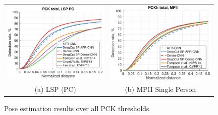 \begin{figure}
  \centering
  \begin{tabular}{c c}  
  \includegraphics[width=0.48\linewidth]{pck-total-lsp-PC.pdf}&
  \includegraphics[width=0.48\linewidth]{pckh-total-mpii.pdf}\\
  (a) LSP (PC)& (b) MPII Single Person \\
  \end{tabular}
  \vspace{-0.1em}
  \caption{Pose estimation results over all PCK thresholds.} 
    \vspace{-1.2em}
  \label{fig:pck-curves}
\end{figure}
